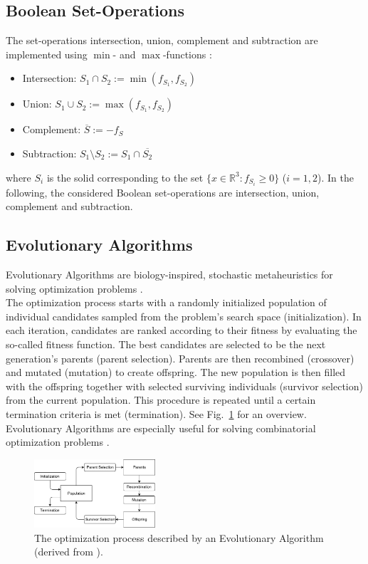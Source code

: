\subsection{Boolean Set-Operations}
The set-operations intersection, union, complement and subtraction are implemented using $\min$- and $\max$-functions \cite{ricci197constgeo}: 
\begin{itemize}
	\item Intersection: $S_1 \cap S_2 := \min(f_{S_1}, f_{S_2})$
	\item Union: $S_1 \cup S_2 := \max(f_{S_1}, f_{S_2})$
	\item Complement: $\overline{S} := -f_S$ %
	\item Subtraction: $S_1 \setminus S_2 := S_1 \cap \overline{S_2}$%
\end{itemize}
where $S_i$ is the solid corresponding to the set $\{x \in \mathbb{R}^3: f_{S_i} \geq 0\}$ ($i=1,2$).
In the following, the considered Boolean set-operations are intersection, union, complement and subtraction.
\subsection{Evolutionary Algorithms} 
Evolutionary Algorithms are biology-inspired, stochastic metaheuristics for solving optimization problems \cite{eiben2003introduction}.
\\
The optimization process starts with a randomly initialized population of individual candidates sampled from the problem's search space (initialization).
In each iteration, candidates are ranked according to their fitness by evaluating the so-called fitness function.
The best candidates are selected to be the next generation's parents (parent selection).
Parents are then recombined (crossover) and mutated (mutation) to create offspring. 
The new population is then filled with the offspring together with selected surviving individuals (survivor selection) from the current population.
This procedure is repeated until a certain termination criteria is met (termination). 
See Fig.~\ref{fig:evo} for an overview.
\\
Evolutionary Algorithms are especially useful for solving combinatorial optimization problems \cite{eiben2003introduction}.
\begin{figure}[htb]
	\centering
	\includegraphics[width=0.4\textwidth]{figures/evo.pdf}
	\caption{The optimization process described by an Evolutionary Algorithm (derived from \cite{eiben2003introduction}).}
	\label{fig:evo}
\end{figure}
